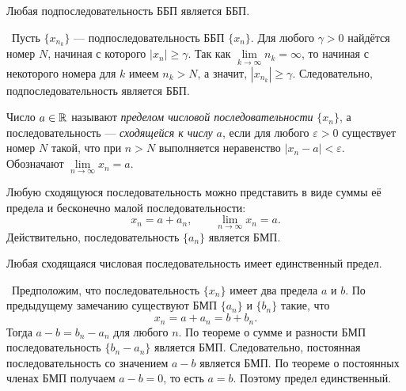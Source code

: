 \begin{theorem}
    Любая подпоследовательность ББП является ББП.

    \vspace{2mm}

    \proofname~Пусть \(\{x_{n_{k}}\}\) --- подпоследовательность ББП
    \(\{x_{n}\}\). Для любого \(\gamma>0\) найдётся номер \(N\), начиная
    с которого \(|x_{n}|\geq\gamma\). Так как \(\lim\limits_{k\to\infty}n_{k}=\infty\), 
    то начиная с некоторого номера для \(k\) имеем \(n_{k}>N\), а значит,
    \(|x_{n_{k}}|\geq\gamma\). Следовательно, подпоследовательность является
    ББП.~\qedsymbol
\end{theorem}


\begin{definition}
    Число \(a\in\mathbb{R}\) называют \textit{пределом числовой последовательности}
    \(\{x_{n}\}\), а последовательность --- \textit{сходящейся к числу}
    \(a\), если для любого \(\varepsilon>0\) существует номер \(N\) такой,
    что при \(n>N\) выполняется неравенство \(|x_{n}-a|<\varepsilon\).
    Обозначают \(\lim\limits_{n\to\infty}x_{n}=a\).
\end{definition}

\begin{note}
    Любую сходящуюся последовательность можно представить в виде суммы
    её предела и бесконечно малой последовательности:
    \[x_{n}=a+a_{n},\qquad \lim\limits_{n\to\infty}x_{n}=a.\]
    Действительно, последовательность \(\{a_{n}\}\) является БМП.
\end{note}

\begin{theorem}
    Любая сходящаяся числовая последовательность имеет единственный предел.

    \vspace{2mm}

    \proofname~Предположим, что последовательность \(\{x_{n}\}\) имеет
    два предела \(a\) и \(b\). По предыдущему замечанию существуют БМП
    \(\{a_{n}\}\) и \(\{b_{n}\}\) такие, что
    \[x_{n}=a+a_{n}=b+b_{n}.\]
    Тогда \(a-b=b_{n}-a_{n}\) для любого \(n\). По теореме о сумме и
    разности БМП последовательность \(\{b_{n}-a_{n}\}\) является БМП.
    Следовательно, постоянная последовательность со значением \(a-b\)
    является БМП. По теореме о постоянных членах БМП получаем \(a-b=0\),
    то есть \(a=b\). Поэтому предел единственный.~\qedsymbol
\end{theorem}

